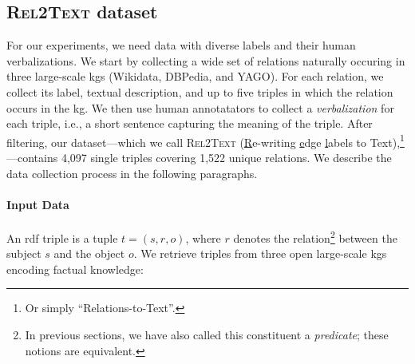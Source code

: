 % 









\subsection{\textsc{Rel2Text} dataset}
\label{sec:rel2text:data}


For our experiments, we need data with diverse labels and their human verbalizations. We start by collecting a wide set of relations naturally occuring in three large-scale \acp{kg} (Wikidata, DBPedia, and YAGO). For each relation, we collect its label, textual description, and up to five triples in which the relation occurs in the \ac{kg}. We then use human annotatators to collect a \emph{verbalization} for each triple, i.e., a short sentence capturing the meaning of the triple. After filtering, our dataset---which we call \textsc{Rel2Text} (\underline{R}e-writing \underline{e}dge \underline{l}abels to Text),\footnote{Or simply ``Relations-to-Text''.}---contains 4,097 single triples covering 1,522 unique relations. We describe the data collection process in the following paragraphs.


\paragraph{Input Data}
An \acs{rdf} triple is a tuple $t = (s, r, o)$, where $r$ denotes the relation\footnote{In previous sections, we have also called this constituent a \emph{predicate}; these notions are equivalent.} between the subject $s$ and the object $o$.
We retrieve triples from three open large-scale \acp{kg} encoding factual knowledge:

